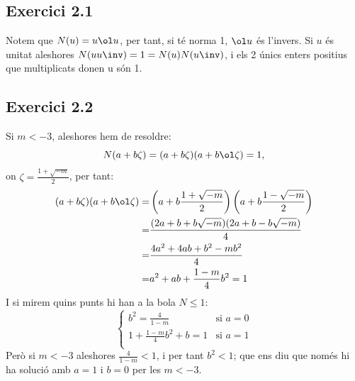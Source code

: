 \documentclass[11pt, a4paper]{article}
\begin{document}
    \subsection{Exercici 2.1}
    Notem que $N(u)=u\ol u$, per tant, si té norma 1, $\ol u$ és l'invers. Si $u$ és unitat aleshores $N(uu\inv)=1=N(u)N(u\inv)$, i els 2 únics enters positius que multiplicats donen u són 1.\par
    \subsection{Exercici 2.2}
    Si $m<-3$, aleshores hem de resoldre:
    \[
        N(a+b\zeta)=(a+b\zeta)(a+b\ol \zeta)=1,
    \]
    on $\zeta=\frac{1+\sqrt{-m}}{2}$, per tant:
    \begin{align*}
        (a+b\zeta)(a+b\ol \zeta)=&\left(a+b\frac{1+\sqrt{-m}}{2}\right)\left(a+b \frac{1-\sqrt{-m}}{2}\right)\\
        =&\frac{(2a+b+b\sqrt{-m})(2a+b-b\sqrt{-m})}{4}\\
        =&\frac{4a^2+4ab+b^2-mb^2}{4}\\
        =&a^2+ab+\frac{1-m}{4}b^2=1
    \end{align*}
    I si mirem quins punts hi han a la bola $N\leq1$:
    \[
        \begin{cases*}
            b^2=\frac{4}{1-m}&\text{si }a=0\\
            1+\frac{1-m}4b^2+b=1&\text{si }a=1\\
        \end{cases*}
    \]
    Però si $m<-3$ aleshores $\frac{4}{1-m}<1$, i per tant $b^2<1$; que ens diu que només hi ha solució amb $a=1$ i $b=0$ per les $m<-3$.
\end{document}
